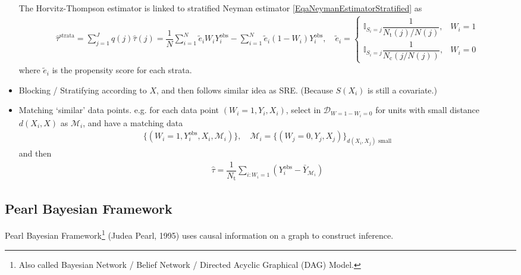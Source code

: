 \begin{itemize}[topsep=2pt,itemsep=0pt]
    The Horvitz-Thompson estimator is linked to stratified Neyman estimator \autoref{EqaNeymanEstimatorStratified} as
    \begin{align*}
         \hat{\tau}^\mathrm{strata}=\sum_{j=1}^Jq(j)\hat{\tau}(j)= \dfrac{1}{N} \sum_{i=1}^N \tilde{e} _iW_iY^\mathrm{obs}_i-\sum_{i=1}^N\tilde{e} _i(1-W_i)Y^\mathrm{obs}_i ,\quad \tilde{e} _i=\begin{cases}
            \mathbb{I}_{S_i=j}\dfrac{1}{N_\mathrm{t}(j)/N(j) },&W_i=1\\
            \mathbb{I}_{S_i=j}\dfrac{1}{N_\mathrm{c}(j/N(j)) },&W_i=0
         \end{cases}
    \end{align*}
    where $ \tilde{e }_i $ is the propensity score for each strata.
    \item Blocking / Stratifying according to $ X $, and then follows similar idea as SRE. (Because $ S(X_i) $ is still a covariate.)
    \item Matching `similar' data points. e.g. for each data point $ (W_i=1,Y_i,X_i) $, select in $ \mathcal{D}_{W=1-W_i=0} $ for units with small distance $ d(X_i,X) $ as $ \mathcal{M}_i $, and have a matching data
    \begin{align*}
        \{(W_i=1,Y_i^\mathrm{obs} ,X_i,\mathcal{M}_i)\},\quad \mathcal{M}_i=\{(W_j=0,Y_j,X_j)\}_{d(X_i,X_j)\text{ small}} 
    \end{align*}
    and then
    \begin{align*}
        \hat{\tau} =\dfrac{1}{N_\mathrm{t} }\sum_{i:W_i=1}\left(Y_i^\mathrm{obs}-\bar{Y}_{\mathcal{M}_i} \right)
    \end{align*}
\end{itemize}


\subsection{Pearl Bayesian Framework}
    Pearl Bayesian Framework\footnote{Also called Bayesian Network / Belief Network / Directed Acyclic Graphical (DAG) Model.} (Judea Pearl, 1995) uses causal information on a graph to construct inference. 













